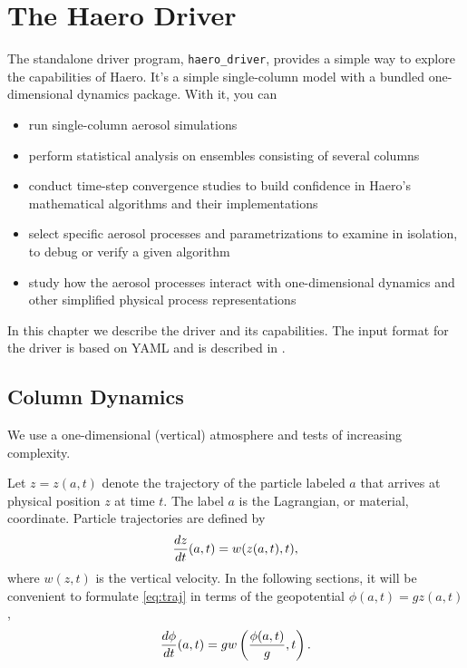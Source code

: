 \chapter{The Haero Driver}

The standalone driver program, \texttt{haero\_driver}, provides a simple way to
explore the capabilities of Haero. It's a simple single-column model with a
bundled one-dimensional dynamics package. With it, you can

\begin{itemize}
  \item run single-column aerosol simulations
  \item perform statistical analysis on ensembles consisting of several columns
  \item conduct time-step convergence studies to build confidence in Haero's
        mathematical algorithms and their implementations
  \item select specific aerosol processes and parametrizations to examine
        in isolation, to debug or verify a given algorithm
  \item study how the aerosol processes interact with one-dimensional dynamics
        and other simplified physical process representations
\end{itemize}

In this chapter we describe the driver and its capabilities. The input format
for the driver is based on YAML and is described in .

\section{Column Dynamics}

We use a one-dimensional (vertical) atmosphere and tests of increasing complexity.

Let $z=z(a,t)$ denote the trajectory of the particle labeled $a$ that arrives at physical position $z$ at time $t$.
The label $a$ is the Lagrangian, or material, coordinate. 
Particle trajectories are defined by
\begin{equation}\label{eq:traj}
\frac{ d z}{d t}(a,t) = w(z(a,t),t),
\end{equation}
where $w(z,t)$ is the vertical velocity.  
In the following sections, it will be convenient to formulate \eqref{eq:traj} in terms of the geopotential $\phi(a,t) = gz(a,t)$, 
\begin{equation}\label{eq:geo_traj}
  \frac{ d \phi}{d t}(a,t) = gw\left(\frac{\phi(a,t)}{g},t\right).
\end{equation}


